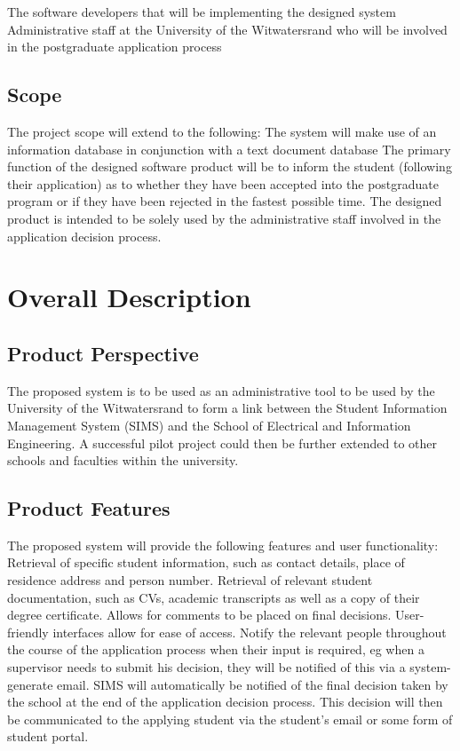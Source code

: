\documentclass[journal,comsoc,onecolumn]{IEEEtran}
\begin{document}
	The software developers that will be implementing the designed system
	Administrative staff at the University of the Witwatersrand who will be involved in the postgraduate application process
	
\subsection{Scope}	
The project scope will extend to the following:
The system will make use of an information database in conjunction with a text document database
The primary function of the designed software product will be to inform the student (following their application) as to whether they have been accepted into the postgraduate program or if they have been rejected in the fastest possible time.
The designed product is intended to be solely used by the administrative staff involved in the application decision process.

\section{Overall Description}

\subsection{Product Perspective}
The proposed system is to be used as an administrative tool to be used by the University of the Witwatersrand to form a link between the Student Information Management System (SIMS) and the School of Electrical and Information Engineering. A successful pilot project could then be further extended to other schools and faculties within the university.

\subsection{Product Features}
The proposed system will provide the following features and user functionality:
Retrieval of specific student information, such as contact details, place of residence address and person number.
Retrieval of relevant student documentation, such as CVs, academic transcripts as well as a copy of their degree certificate.
Allows for comments to be placed on final decisions.
User-friendly interfaces allow for ease of access.
Notify the relevant people throughout the course of the application process when their input is required, eg when a supervisor needs to submit his decision, they will be notified of this via a system-generate email.
SIMS will automatically be notified of the final decision taken by the school at the end of the application decision process. This decision will then be communicated to the applying student via the student’s email or some form  of student portal.
\end{document}
